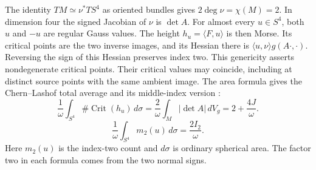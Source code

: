 \documentclass[11pt,letterpaper]{article}
\numberwithin{equation}{section}
\DeclareMathOperator{\Crit}{Crit}
\begin{document}
The identity \(TM\simeq\nu^*TS^4\) as oriented bundles
gives \(2\deg\nu=\chi(M)=2\). In dimension four the signed
Jacobian of \(\nu\) is \(\det A\). For almost every
\(u\in S^4\), both \(u\) and \(-u\) are regular Gauss values.
The height \(h_u=\langle F,u\rangle\) is then Morse. Its
critical points are the two inverse images, and its Hessian
there is \(\langle u,\nu\rangle g(A\cdot,\cdot)\). Reversing
the sign of this Hessian preserves index two. This genericity
asserts nondegenerate critical points. Their critical values
may coincide, including at distinct source points with the
same ambient image. The area
formula gives the Chern--Lashof total average
\cite{ChernLashof1957Curvature} and its middle-index version
\cite[\S\S2--3]{OntiVlachos2017Hypersurfaces}:
\begin{equation}\label{eq:averages}
 \frac1\omega\int_{S^4}\#\Crit(h_u)\,d\sigma
 =\frac2\omega\int_M|\det A|\,dV_g=2+\frac{4J}{\omega}.
\end{equation}
\begin{equation}\label{eq:middle-mass}
 \frac1\omega\int_{S^4}m_2(u)\,d\sigma=\frac{2 I_2}{\omega}.
\end{equation}
Here \(m_2(u)\) is the index-two count and \(d\sigma\) is
ordinary spherical area. The factor two in each formula
comes from the two normal signs.
\end{document}
